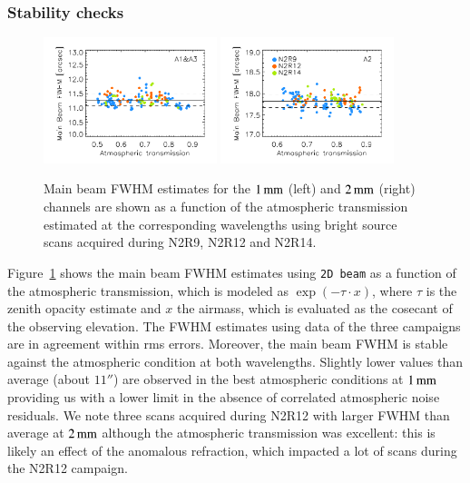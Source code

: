 \subsubsection{Stability checks}
\label{se:mainbeam_stability}

\begin{figure}[!thbp]
\begin{center}
  \includegraphics[clip, width=0.45\textwidth]{Figures/plot_FWHM_vs_atmtrans_mb_radius_binning2_1mm.pdf}
  \includegraphics[clip, width=0.45\textwidth]{Figures/plot_FWHM_vs_atmtrans_mb_radius_binning2_a2.pdf}
  \caption[Main Beam FWHM]{Main beam FWHM estimates for the
    $1\,\rm{mm}$ (left) and $2\,\rm{mm}$ (right) channels are shown as
    a function of the atmospheric transmission estimated at the
    corresponding wavelengths using bright source scans acquired during N2R9, N2R12 and N2R14. }
\label{fig:fwhm_map_atmtrans}
\end{center}
\end{figure}

Figure~\ref{fig:fwhm_map_atmtrans} shows the main beam FWHM estimates
using {\tt 2D beam} as a function of the atmospheric transmission,
which is modeled as $\exp{\left(-\tau \cdot x\right)}$, where $\tau$
is the zenith opacity estimate and
$x$ the airmass, which is evaluated as the cosecant of the observing
elevation. The FWHM estimates using data of the three campaigns are in
agreement within rms errors. Moreover, the main beam FWHM is stable
against the atmospheric condition at both wavelengths. Slightly lower
values than average (about $11''$) are observed in the best
atmospheric conditions at $1\,\rm{mm}$ providing us with a lower limit
in the absence of correlated atmospheric noise residuals. We note
three scans acquired during N2R12 with larger FWHM than average at
$2\,\rm{mm}$ although the atmospheric transmission was excellent: this
is likely an effect of the anomalous refraction, which impacted
a lot of scans during the N2R12 campaign. 




